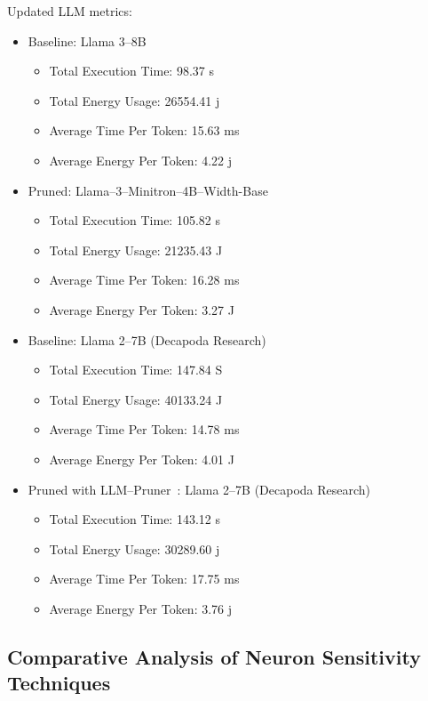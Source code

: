 \documentclass{article}
\begin{document}
    Updated LLM metrics:
    \begin{itemize}
        \item Baseline: Llama 3--8B
        \begin{itemize}
            \item Total Execution Time: 98.37 s
            \item Total Energy Usage: 26554.41 j
            \item Average Time Per Token: 15.63 ms
            \item Average Energy Per Token: 4.22 j
        \end{itemize}
        \item Pruned: Llama--3--Minitron--4B--Width-Base
        \begin{itemize}
            \item Total Execution Time: 105.82 s
            \item Total Energy Usage: 21235.43 J
            \item Average Time Per Token: 16.28 ms
            \item Average Energy Per Token: 3.27 J
        \end{itemize}
        \item Baseline: Llama 2--7B (Decapoda Research)~\cite{decapoda-llama-7B}
        \begin{itemize}
            \item Total Execution Time: 147.84 S
            \item Total Energy Usage: 40133.24 J
            \item Average Time Per Token: 14.78 ms
            \item Average Energy Per Token: 4.01 J
        \end{itemize}
        \item Pruned with LLM--Pruner~\cite{ma2023llm}: Llama 2--7B (Decapoda Research)
        \begin{itemize}
            \item Total Execution Time: 143.12 s
            \item Total Energy Usage: 30289.60 j
            \item Average Time Per Token: 17.75 ms
            \item Average Energy Per Token: 3.76 j
        \end{itemize}
    \end{itemize}

    \subsection{Comparative Analysis of Neuron Sensitivity Techniques}\label{subsec:comparative-analysis-of-neuron-sensitivity-techniques}
\end{document}

